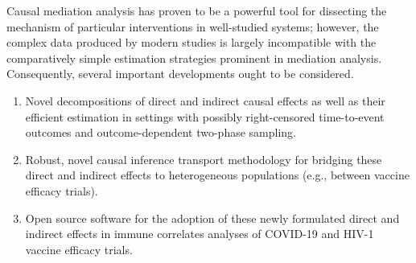 Causal mediation analysis has proven to be a powerful tool for dissecting the
mechanism of particular interventions in well-studied systems; however, the
complex data produced by modern studies is largely incompatible with the
comparatively simple estimation strategies prominent in mediation analysis.
Consequently, several important developments ought to be considered.
\begin{enumerate}[label=(\alph*),topsep=0.5pt,itemsep=0pt,partopsep=1ex,parsep=1ex]
  \item Novel decompositions of direct and indirect causal effects as well as
      their efficient estimation in settings with possibly right-censored
      time-to-event outcomes and outcome-dependent two-phase sampling.
  \item Robust, novel causal inference transport methodology for bridging these
    direct and indirect effects to heterogeneous populations (e.g., between
    vaccine efficacy trials).
  \item Open source software for the adoption of these newly formulated direct
    and indirect effects in immune correlates analyses of COVID-19 and HIV-1
     vaccine efficacy trials.
\end{enumerate}

